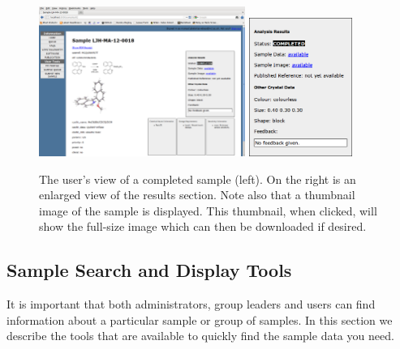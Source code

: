\documentclass[12pt,twoside]{article}
\begin{document}
\begin{enumerate}[(i)]
\begin{figure}[!htb]
\begin{center}
\includegraphics[width=0.60\textwidth]{sampleshowpage}
\quad
\includegraphics[width=0.30\textwidth]{sampleresults}
\caption{The user's view of a completed sample (left). On the right is
an enlarged view of the results section. Note also that a thumbnail image
of the sample is displayed. This thumbnail, when clicked, will show the
full-size image which can then be downloaded if desired.\label{fig:sampleshowpage}}
\end{center}
\end{figure}


\end{enumerate}

\subsection{Sample Search and Display Tools}
It is important that both administrators, group leaders and users can
find information about a particular sample or group of samples.
In this section we describe the tools that are available to quickly find
the sample data you need.
\end{document}
